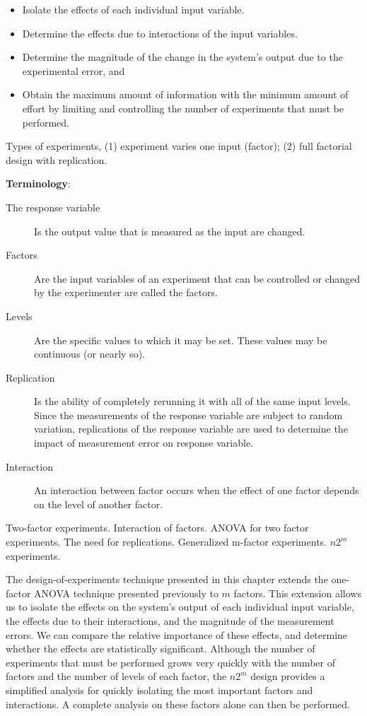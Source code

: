 \documentclass[openany, a4paper]{book}
\theoremstyle{break}
\theoremstyle{example}
\theoremstyle{note}
\theoremstyle{break}
\theoremstyle{exercise}
\begin{document}
\begin{itemize}
\item Isolate the effects of each individual input variable.
\item Determine the effects due to interactions of the input variables.
\item Determine the magnitude of the change in the system's output due to the
experimental error, and
\item Obtain the maximum amount of information with the minimum amount of effort
by limiting and controlling the number of experiments that must be
performed.
\end{itemize}

Types of experiments, (1) experiment varies one input (factor); (2) full
factorial design with replication.

\textbf{Terminology}:

\begin{description}
\item[{The response variable}] Is the output value that is measured as the input
are changed.
\item[{Factors}] Are the input variables of an experiment that can be controlled
or changed by the experimenter are called the factors.
\item[{Levels}] Are the specific values to which it may be set. These values may
be continuous (or nearly so).
\item[{Replication}] Is the ability of completely rerunning it with all of the
same input levels. Since the measurements of the response variable are
subject to random variation, replications of the response variable are
used to determine the impact of measurement error on response variable.
\item[{Interaction}] An interaction between factor occurs when the effect of one
factor depends on the level of another factor.
\end{description}


Two-factor experiments. Interaction of factors. ANOVA for two factor
experiments. The need for replications. Generalized m-factor
experiments. \(n2^m\) experiments.

The design-of-experiments technique presented in this chapter extends the
one-factor ANOVA technique presented previously to \(m\) factors. This
extension allows us to isolate the effects on the system's output of each
individual input variable, the effects due to their interactions, and the
magnitude of the measurement errors. We can compare the relative importance
of these effects, and determine whether the effects are statistically
significant. Although the number of experiments that must be performed grows
very quickly with the number of factors and the number of levels of each
factor, the \(n2^m\) design provides a simplified analysis for quickly
isolating the most important factors and interactions. A complete analysis
on these factors alone can then be performed.
\end{document}
